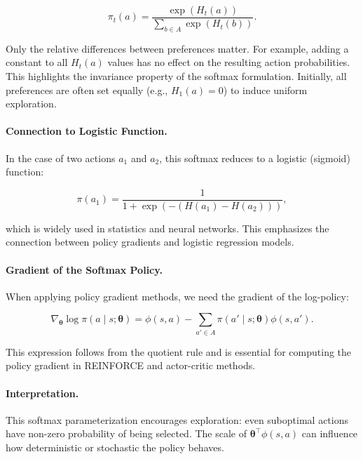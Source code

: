 \[
\pi_t(a) = \frac{\exp(H_t(a))}{\sum_{b \in A} \exp(H_t(b))}.
\]

Only the relative differences between preferences matter. For example, adding a constant to all \( H_t(a) \) values has no effect on the resulting action probabilities. This highlights the invariance property of the softmax formulation. Initially, all preferences are often set equally (e.g., \( H_1(a) = 0 \)) to induce uniform exploration.

\paragraph{Connection to Logistic Function.}
In the case of two actions \( a_1 \) and \( a_2 \), this softmax reduces to a logistic (sigmoid) function:

\[
\pi(a_1) = \frac{1}{1 + \exp(-(H(a_1) - H(a_2)))},
\]

which is widely used in statistics and neural networks. This emphasizes the connection between policy gradients and logistic regression models.

\paragraph{Gradient of the Softmax Policy.} 
When applying policy gradient methods, we need the gradient of the log-policy:

\[
\nabla_{\boldsymbol{\theta}} \log \pi(a \mid s; \boldsymbol{\theta}) = \phi(s, a) - \sum_{a' \in A} \pi(a' \mid s; \boldsymbol{\theta}) \phi(s, a').
\]

This expression follows from the quotient rule and is essential for computing the policy gradient in REINFORCE and actor-critic methods.

\paragraph{Interpretation.}
This softmax parameterization encourages exploration: even suboptimal actions have non-zero probability of being selected. The scale of \( \boldsymbol{\theta}^\top \phi(s, a) \) can influence how deterministic or stochastic the policy behaves.